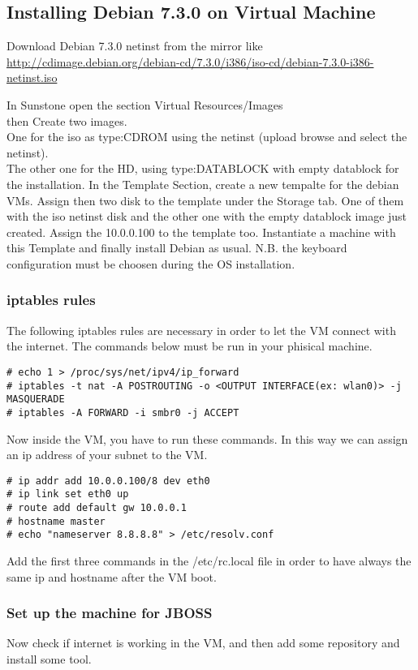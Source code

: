 \documentclass[11pt,a4paper]{article}
\begin{document}
\subsection{Installing Debian 7.3.0 on Virtual Machine}
Download Debian 7.3.0 netinst from the mirror like \url{http://cdimage.debian.org/debian-cd/7.3.0/i386/iso-cd/debian-7.3.0-i386-netinst.iso}

In Sunstone open the section Virtual Resources/Images\\
then Create two images.\\
One for the iso as type:CDROM using the netinst (upload browse and select the netinst).\\
The other one for the HD, using type:DATABLOCK with empty datablock for the installation.
In the Template Section, create a new tempalte for the debian VMs. Assign then two disk to the template under the Storage tab. One of them with the iso netinst disk and the other one with the empty datablock image just created. Assign the 10.0.0.100 to the template too.
Instantiate a machine with this Template and finally install Debian as usual.
N.B. the keyboard configuration must be choosen during the OS installation.

\subsubsection{iptables rules}
The following iptables rules are necessary in order to let the VM connect with the internet.
The commands below must be run in your phisical machine.
\begin{lstlisting}
# echo 1 > /proc/sys/net/ipv4/ip_forward
# iptables -t nat -A POSTROUTING -o <OUTPUT INTERFACE(ex: wlan0)> -j MASQUERADE
# iptables -A FORWARD -i smbr0 -j ACCEPT
\end{lstlisting}

Now inside the VM, you have to run these commands. In this way we can assign an ip address of your subnet to the VM.
\begin{lstlisting}
# ip addr add 10.0.0.100/8 dev eth0
# ip link set eth0 up
# route add default gw 10.0.0.1 
# hostname master
# echo "nameserver 8.8.8.8" > /etc/resolv.conf
\end{lstlisting}
Add the first three commands in the /etc/rc.local file in order to have always the same ip and hostname after the VM boot.

\subsubsection{Set up the machine for JBOSS}
Now check if internet is working in the VM, and then add some repository and install some tool.
\end{document}
